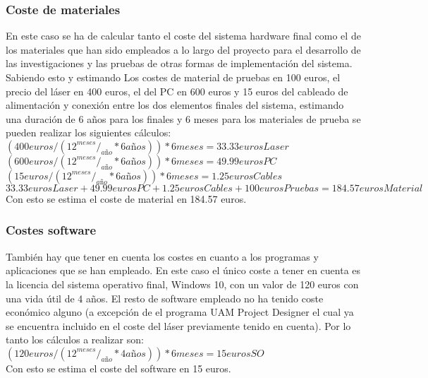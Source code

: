 \subsubsection{Coste de materiales}
En este caso se ha de calcular tanto el coste del sistema hardware final como el de los materiales que han sido empleados a lo largo del proyecto para el desarrollo de las investigaciones y las pruebas de otras formas de implementación del sistema. Sabiendo esto y estimando Los costes de material de pruebas en 100 euros, el precio del láser en 400 euros, el del PC en 600 euros y 15 euros del cableado de alimentación y conexión entre los dos elementos finales del sistema, estimando una duración de 6 años para los finales y 6 meses para los materiales de prueba se pueden realizar los siguientes cálculos: \\
$(400 euros / (12 ^{meses}/_{año} * 6 años)) * 6 meses = 33.33 eurosLaser$\\
$(600 euros / (12 ^{meses}/_{año} * 6 años)) * 6 meses = 49.99 eurosPC$\\
$(15 euros / (12 ^{meses}/_{año} * 6 años)) * 6 meses = 1.25 eurosCables$\\
$33.33 eurosLaser + 49.99 eurosPC + 1.25 eurosCables + 100 eurosPruebas = 184.57 eurosMaterial$\\
Con esto se estima el coste de material en 184.57 euros.\\

\subsubsection{Costes software}
También hay que tener en cuenta los costes en cuanto a los programas y aplicaciones que se han empleado. En este caso el único coste a tener en cuenta es la licencia del sistema operativo final, Windows 10, con un valor de 120 euros con una vida útil de 4 años. El resto de software empleado no ha tenido coste económico alguno (a excepción de el programa UAM Project Designer el cual ya se encuentra incluido en el coste del láser previamente tenido en cuenta). Por lo tanto los cálculos a realizar son:\\
$(120 euros / (12 ^{meses}/_{año} * 4 años)) * 6 meses = 15 eurosSO$\\
Con esto se estima el coste del software en 15 euros.\\

